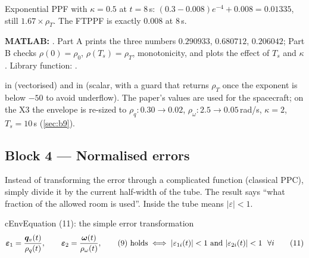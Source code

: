 \begin{toybox}[finite time versus exponential, $T_s=8$\,s]
Exponential PPF with $\kappa=0.5$ at $t=8$\,s: $(0.3-0.008)e^{-4}+0.008=0.01335$, still $1.67\times\rho_T$. The FTPPF is
exactly $0.008$ at $8$\,s.
\end{toybox}

\begin{codebox}
\textbf{MATLAB:} . Part A prints the three numbers $0.290933$, $0.680712$, $0.206042$;
Part B checks $\rho(0)=\rho_0$, $\rho(T_s)=\rho_T$, monotonicity, and plots the effect of $T_s$ and $\kappa$.
Library function: .
\end{codebox}

\begin{projbox}
 in  (vectorised) and in  (scalar, with a guard
that returns $\rho_T$ once the exponent is below $-50$ to avoid underflow). The paper's values are used for the
spacecraft; on the X3 the envelope is re-sized to $\rho_q:0.30\to0.02$, $\rho_\omega:2.5\to0.05$\,rad/s, $\kappa=2$,
$T_s=10$\,s (\cref{sec:b9}).
\end{projbox}

\subsection{Block 4 --- Normalised errors}
\label{sec:b4}

\begin{idea}
Instead of transforming the error through a complicated function (classical PPC), simply divide it by the current
half-width of the tube. The result says ``what fraction of the allowed room is used''. Inside the tube means
$|\varepsilon|<1$.
\end{idea}

\begin{eqbox}{cEnv}{Equation (11): the simple error transformation}
\begin{equation}
\veps_1=\frac{\qv(t)}{\rho_q(t)},\qquad \veps_2=\frac{\vw(t)}{\rho_\omega(t)},\qquad
\text{(9) holds}\iff |\varepsilon_{1i}(t)|<1\ \text{and}\ |\varepsilon_{2i}(t)|<1\ \ \forall i \tag{11}\label{eq:eps}
\end{equation}
\end{eqbox}

